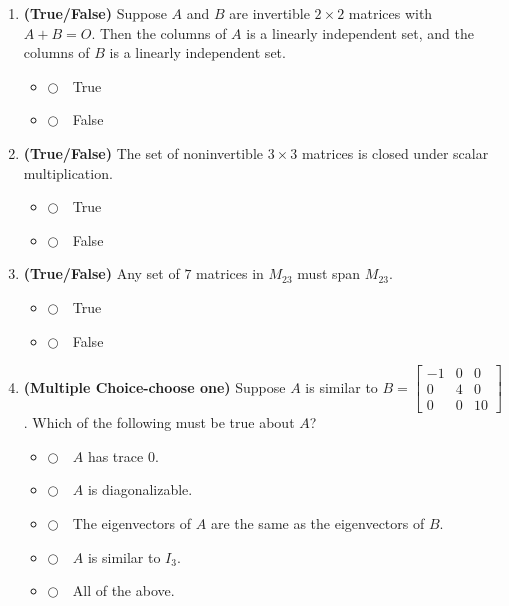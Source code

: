 \documentclass[12pt]{extarticle}
\newcommand{\chooseone}{{\Large$\Circle$\ \ }}
\begin{document}
\begin{enumerate}
\begin{enumerate}[label=\alph*.]
\item \textbf{(True/False)} Suppose $A$ and $B$ are invertible $2\times 2$ matrices with $A+B=O$. Then the columns of $A$ is a linearly independent set, and the columns of $B$ is a linearly independent set. 
\begin{itemize}[label={}] 
\item \chooseone True
\item \chooseone False
\end{itemize}
\vspace{2cm}

\item \textbf{(True/False)} The set of noninvertible $3\times 3$ matrices is closed under scalar multiplication.
\begin{itemize}[label={}] 
\item \chooseone True
\item \chooseone False
\end{itemize}
\vspace{2cm}

\item  \textbf{(True/False)} Any set of $7$ matrices in $M_{23}$ must span $M_{23}$.

\begin{itemize}[label={}]
\item \chooseone True
\item \chooseone False
\end{itemize}


\newpage

\item \textbf{(Multiple Choice-choose one)} Suppose $A$ is similar to $B=\begin{bmatrix} -1 & 0 & 0 \\ 0 & 4 & 0\\ 0 & 0 & 10\end{bmatrix}$. Which of the following must be true about $A$?
\begin{itemize}[label={}]
\item \chooseone $A$ has trace $0$.
\item \chooseone $A$ is diagonalizable.
\item \chooseone The eigenvectors of $A$ are the same as the eigenvectors of $B$.
\item \chooseone  $A$ is similar to $I_3$.
\item \chooseone All of the above.
\end{itemize}

\vspace{2cm}



\end{enumerate}
\end{enumerate}
\end{document}
